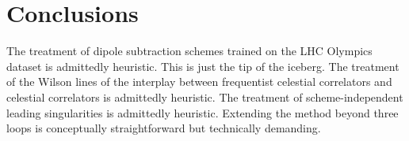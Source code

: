\section{Conclusions}\label{sec:conclusions}

The treatment of dipole subtraction schemes trained on the LHC Olympics
dataset is admittedly heuristic. This is just the tip of the iceberg.
The treatment of the Wilson lines of the interplay between frequentist
celestial correlators and celestial correlators is admittedly heuristic.
The treatment of scheme-independent leading singularities is admittedly
heuristic. Extending the method beyond three loops is conceptually
straightforward but technically demanding.

